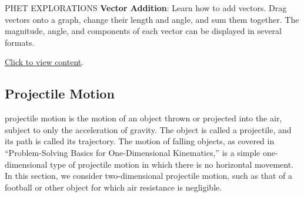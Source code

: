 \documentclass[../../main-ap-physics.tex]{subfiles}
\begin{document}
\begin{center}
    \captionsetup{type=figure,margin=1in,font=scriptsize}
    \label{g2pI0f}
\end{center}

\begin{gradient}{PHET EXPLORATIONS}
    \textbf{Vector Addition}: Learn how to add vectors. Drag vectors onto a graph, change their length and angle, and sum them together. The magnitude, angle, and components of each vector can be displayed in several formats.

    \vspace{1em}

    \href{https://phet.colorado.edu/sims/html/vector-addition/latest/vector-addition_all.html}{Click to view content}.
\end{gradient}

\subsection{Projectile Motion}

\Gls{projectile motion} is the \gls{motion} of an object thrown or projected into the air, subject to only the acceleration of gravity. The object is called a \gls{projectile}, and its path is called its \gls{trajectory}. The motion of falling objects, as covered in ``Problem-Solving Basics for One-Dimensional Kinematics,'' is a simple one-dimensional type of projectile motion in which there is no horizontal movement. In this section, we consider two-dimensional projectile motion, such as that of a football or other object for which \gls{air resistance} is negligible.

\vspace{1em}
\end{document}
